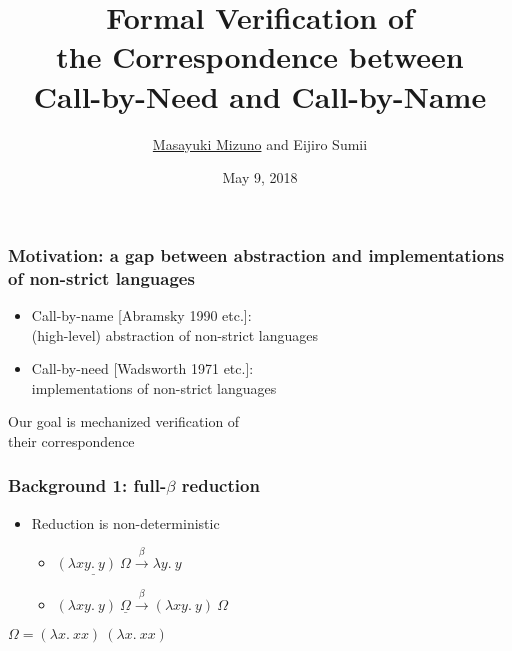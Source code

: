 \documentclass[dvipdfmx,cjk,xcolor=dvipsnames,envcountsect,notheorems,12pt]{beamer}
\title{Formal Verification of\\ the Correspondence between \\ Call-by-Need and Call-by-Name}
\author{\underline{Masayuki Mizuno} and Eijiro Sumii}
\institute[Tohoku University Sumii-Matsuda Laboratory]{Tohoku University}%
\date{May 9, 2018}
\theoremstyle{definition}
\newcommand{\FULLBETA}{\xrightarrow{\beta}}
\begin{document}
\frame[plain]{\titlepage}%

\begin{frame}
	\frametitle{Motivation: a gap between abstraction and implementations of non-strict languages}
	\begin{itemize}
		\item Call-by-name [Abramsky 1990 etc.]:\\(high-level) abstraction of non-strict languages
		\item Call-by-need [Wadsworth 1971 etc.]:\\implementations of non-strict languages
	\end{itemize}
	\vfill
	\begin{center}
		\Large
		Our goal is mechanized verification of\\ their correspondence
	\end{center}
\end{frame}

\begin{frame}
	\frametitle{Background 1: full-$\beta$ reduction}
	\vspace{-\baselineskip}
	\begin{itemize}
		\item Reduction is non-deterministic
			\begin{itemize}
				\item $\underline{(\lambda xy.~y)~\Omega} \FULLBETA \lambda y.~y$
			\end{itemize}
			\begin{itemize}
				\item $(\lambda xy.~y)~\underline{\Omega} \FULLBETA (\lambda xy.~y)~\Omega$
			\end{itemize}
	\end{itemize}
	\vfill
	\begin{flushright}
		\Large $\Omega=(\lambda x.~xx)~(\lambda x.~xx)$
	\end{flushright}
\end{frame}
\end{document}
